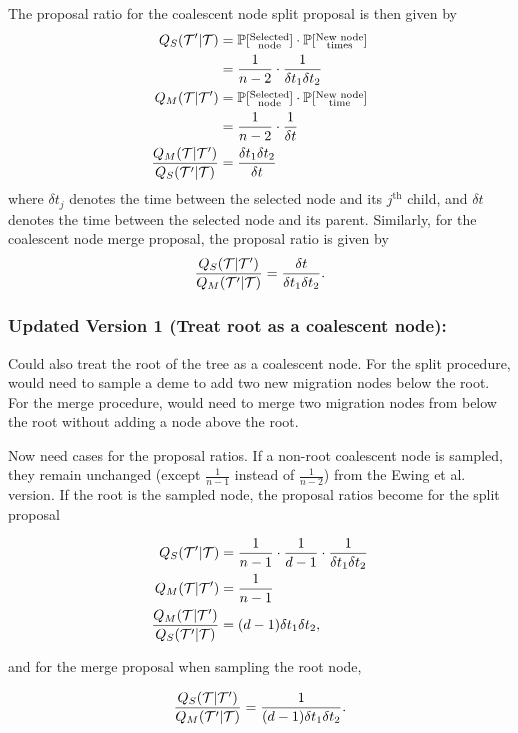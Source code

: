 	The proposal ratio for the coalescent node split proposal is then given by
		\begin{align*}
			Q_S (\mathcal{T}' | \mathcal{T}) & = \mathbb{P}[\substack{\text{Selected} \\ \text{node}}] \cdot \mathbb{P}[ \substack{\text{New node} \\ \text{times}} ] \\
			& = \frac{1}{n-2} \cdot \frac{1}{\delta t_1 \delta t_2} \\
			Q_M (\mathcal{T} | \mathcal{T}') & = \mathbb{P}[\substack{\text{Selected} \\ \text{node}}] \cdot \mathbb{P}[\substack{\text{New node} \\ \text{time}} ] \\
			& = \frac{1}{n-2} \cdot \frac{1}{\delta t} \\
			\frac{Q_M(\mathcal{T} | \mathcal{T}')}{Q_S (\mathcal{T}' | \mathcal{T})} & = \frac{\delta t_1 \delta t_2}{\delta t}
		\end{align*}
	where $\delta t_j$ denotes the time between the selected node and its $j^\text{th}$ child, and $\delta t$ denotes the time between the selected node and its parent. Similarly, for the coalescent node merge proposal, the proposal ratio is given by
		\[
			\frac{Q_S(\mathcal{T} | \mathcal{T}')}{Q_M (\mathcal{T}' | \mathcal{T})} = \frac{\delta t}{\delta t_1 \delta t_2}.
		\]

\subsubsection{Updated Version 1 (Treat root as a coalescent node):}
	Could also treat the root of the tree as a coalescent node. For the split procedure, would need to sample a deme to add two new migration nodes below the root. For the merge procedure, would need to merge two migration nodes from below the root without adding a node above the root.
	
	Now need cases for the proposal ratios. If a non-root coalescent node is sampled, they remain unchanged (except $\frac{1}{n-1}$ instead of $\frac{1}{n-2}$) from the Ewing et al. version. If the root is the sampled node, the proposal ratios become for the split proposal
	
	\begin{align*}
		Q_S (\mathcal{T}' | \mathcal{T}) & = \frac{1}{n-1} \cdot \frac{1}{d-1} \cdot \frac{1}{\delta t_1 \delta t_2} \\
		Q_M (\mathcal{T} | \mathcal{T}') & = \frac{1}{n-1} \\
		\frac{Q_M(\mathcal{T} | \mathcal{T}')}{Q_S (\mathcal{T}' | \mathcal{T})} & = (d-1) \delta t_1 \delta t_2,
	\end{align*}
	
	and for the merge proposal when sampling the root node,
	
	\[
		\frac{Q_S(\mathcal{T} | \mathcal{T}')}{Q_M (\mathcal{T}' | \mathcal{T})} = \frac{1}{(d-1) \delta t_1 \delta t_2}.
	\]